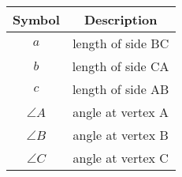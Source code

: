 \begin{tabular}[12pt]{ |c|c|}
    \hline
    \textbf{Symbol} & \textbf{Description} \\
    \hline
    \textbf{$a$} & length of side BC\\
    \hline
    \textbf{$b$} & length of side CA\\
    \hline
    \textbf{$c$} & length of side AB\\
    \hline
    $\angle A$ & angle at vertex A\\
    \hline
    $\angle B$ & angle at vertex B\\
    \hline
    $\angle C$ & angle at vertex C\\
    \hline
    \end{tabular}
